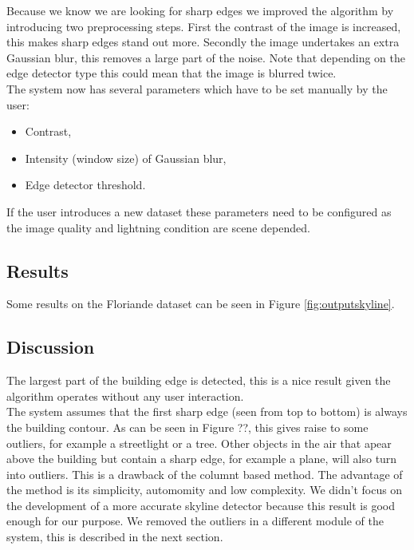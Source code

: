 Because we know we are looking for sharp edges we improved the algorithm by
introducing two preprocessing steps. First the contrast of the image is
increased, this makes sharp edges stand out more.  Secondly the image undertakes
an extra Gaussian blur, this removes a large part of the noise. Note that
depending on the edge detector type this could mean that the image is blurred
twice.\\


The system now has several parameters which have to be set manually by the user:
\begin{itemize}
	\item Contrast,
	\item Intensity (window size) of Gaussian blur,
	\item Edge detector threshold.
\end{itemize}

If the user introduces a new dataset these parameters need to be configured
as the image quality and lightning condition are scene depended.


\subsection{Results}%
Some results on the Floriande dataset %
 can be seen in Figure \ref{fig:outputskyline}.



\subsection{Discussion}  %
The largest part of the building edge is detected, this is a nice result given
the algorithm operates without any user interaction.\\
The system assumes that the first sharp edge (seen from top to bottom) is always
the building contour. As can be seen in Figure ??, this gives raise to some
outliers, for example a streetlight or a tree. 
Other objects in the air that apear above the building but contain a sharp edge,
for example a plane, will also turn into outliers.  This is a drawback of the
	columnt based method.
The advantage of the method is its simplicity, automomity and low complexity.
We didn't focus on the development of a more accurate skyline detector because
this result is good enough for our purpose. We removed the outliers in a
different module of the system, this is described in the next section.  

